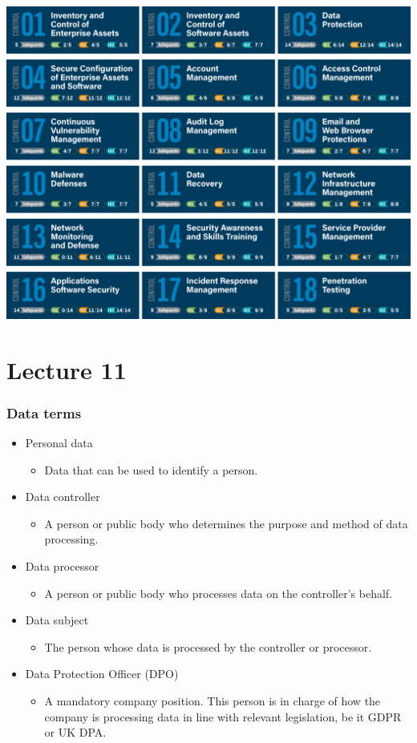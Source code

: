\documentclass[12pt]{report}
\begin{document}
\includegraphics[width=.95\linewidth]{CIS18.png}

\chapter{Lecture 11}
\subsection{Data terms}
\begin{itemize}
	\item Personal data
	\begin{itemize}
		\item Data that can be used to identify a person.
	\end{itemize}
	\item Data controller
	\begin{itemize}
		\item A person or public body who determines the purpose and method of data processing.
	\end{itemize}
	\item Data processor
	\begin{itemize}
		\item A person or public body who processes data on the controller's behalf.
	\end{itemize}
	\item Data subject
	\begin{itemize}
		\item The person whose data is processed by the controller or processor.
	\end{itemize}
	\item Data Protection Officer (DPO)
	\begin{itemize}
		\item A mandatory company position. This person is in charge of how the company is processing data in line with relevant legislation, be it GDPR or UK DPA.
	\end{itemize}
\end{itemize}
\end{document}

